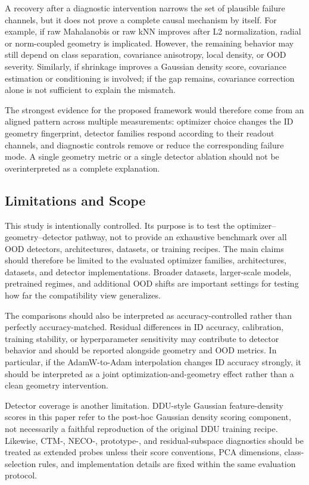 A recovery after a diagnostic intervention narrows the set of plausible failure
channels, but it does not prove a complete causal mechanism by itself. For
example, if raw Mahalanobis or raw kNN improves after L2 normalization, radial or
norm-coupled geometry is implicated. However, the remaining behavior may still
depend on class separation, covariance anisotropy, local density, or OOD
severity. Similarly, if shrinkage improves a Gaussian density score, covariance
estimation or conditioning is involved; if the gap remains, covariance correction
alone is not sufficient to explain the mismatch.

The strongest evidence for the proposed framework would therefore come from an
aligned pattern across multiple measurements: optimizer choice changes the ID
geometry fingerprint, detector families respond according to their readout
channels, and diagnostic controls remove or reduce the corresponding failure
mode. A single geometry metric or a single detector ablation should not be
overinterpreted as a complete explanation.

\subsection{Limitations and Scope}
\label{subsec:limitations-scope}

This study is intentionally controlled. Its purpose is to test the
optimizer--geometry--detector pathway, not to provide an exhaustive benchmark
over all OOD detectors, architectures, datasets, or training recipes. The main
claims should therefore be limited to the evaluated optimizer families,
architectures, datasets, and detector implementations. Broader datasets,
larger-scale models, pretrained regimes, and additional OOD shifts are important
settings for testing how far the compatibility view generalizes.

The comparisons should also be interpreted as accuracy-controlled rather than
perfectly accuracy-matched. Residual differences in ID accuracy, calibration,
training stability, or hyperparameter sensitivity may contribute to detector
behavior and should be reported alongside geometry and OOD metrics. In
particular, if the AdamW-to-Adam interpolation changes ID accuracy strongly, it
should be interpreted as a joint optimization-and-geometry effect rather than a
clean geometry intervention.

Detector coverage is another limitation. DDU-style Gaussian feature-density
scores in this paper refer to the post-hoc Gaussian density scoring component,
not necessarily a faithful reproduction of the original DDU training recipe.
Likewise, CTM-, NECO-, prototype-, and residual-subspace diagnostics should be
treated as extended probes unless their score conventions, PCA dimensions,
class-selection rules, and implementation details are fixed within the same
evaluation protocol.

